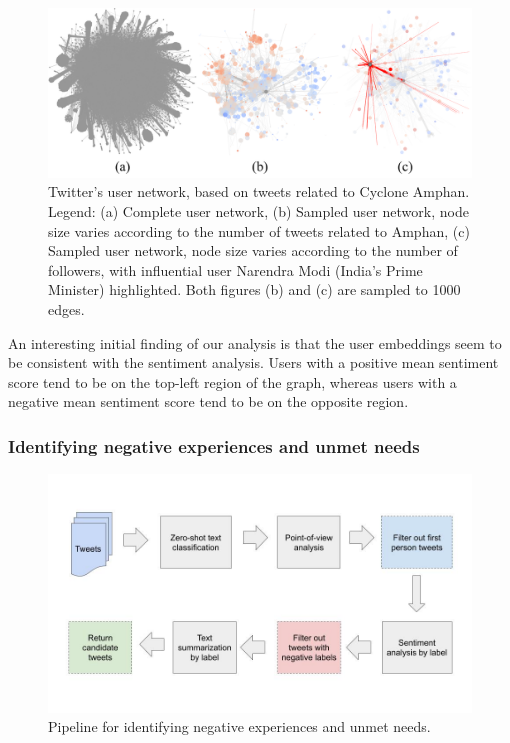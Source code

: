\documentclass{article}
\begin{document}
\begin{figure}
    \includegraphics[width=\linewidth, trim=4 4 4 4,clip]{../figures/figures_network.pdf}
  \caption{Twitter's user network, based on tweets related to Cyclone Amphan. Legend: (a) Complete user
  network, (b) Sampled user network, node size varies according to the number of tweets related to
  Amphan, (c) Sampled user network, node size varies according to the number of followers, with
  influential user Narendra Modi (India's Prime Minister) highlighted. Both figures (b) and (c) are
  sampled to 1000 edges.}
  \label{fig:network_results}
\end{figure}

An interesting initial finding of our analysis is that the user embeddings seem to be consistent
with the sentiment analysis. Users with a positive mean sentiment score tend to be on the top-left
region of the graph, whereas users with a negative mean sentiment score tend to be on the opposite
region. 

\subsubsection{Identifying negative experiences and unmet needs}

\begin{figure}
    \includegraphics[width=\linewidth, trim=0 50 0 50]{../figures/figures_rq1_pipeline.jpg}
  \caption{Pipeline for identifying negative experiences and unmet needs.}
  \label{fig:rq1pipeline}
\end{figure}
\end{document}

